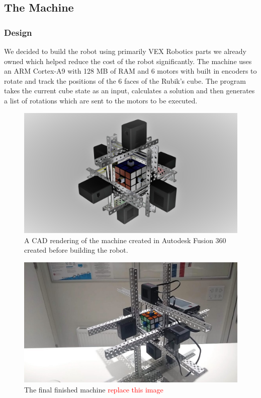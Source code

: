 \documentclass[8pt]{article}
\begin{document}
\subsection{The Machine}

\subsubsection{Design} 

We decided to build the robot using primarily VEX Robotics parts we already owned which helped
reduce the cost of the robot significantly. The machine uses an ARM Cortex-A9 with 
128 MB of RAM and 6 motors with built in encoders to rotate and track the
positions of the 6 faces of the Rubik's cube. The program takes the current cube state 
as an input, calculates a solution and then generates a list of rotations which are sent 
to the motors to be executed.
    

\begin{minipage}{0.45\textwidth}
\begin{figure}[H]

\includegraphics[scale=0.05]{main cad.jpg}
\caption{A CAD rendering of the machine created in Autodesk Fusion 360 created 
before building the robot.}
\end{figure}
\end{minipage}%
\hfill
\begin{minipage}{0.45\textwidth}
\begin{figure}[H]

\includegraphics[scale=0.05]{final machine.jpg}
\caption{The final finished machine \textcolor{red}{replace this image}}
\end{figure}    
\end{minipage}
\end{document}
